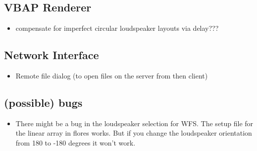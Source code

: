 \subsection{VBAP Renderer}
%
\begin{itemize}
\item compensate for imperfect circular loudspeaker layouts via delay???
\end{itemize}
%
%
\subsection{Network Interface}
%
\begin{itemize}
\item Remote file dialog (to open files on the server from then client)
\end{itemize}
%
%
%
\subsection{(possible) bugs}
%
%
\begin{itemize}
\item There might be a bug in the loudspeaker selection for WFS. The setup file for
the linear array in flores works. But if you change the loudspeaker orientation from 180
to -180 degrees it won't work.
\end{itemize}
%